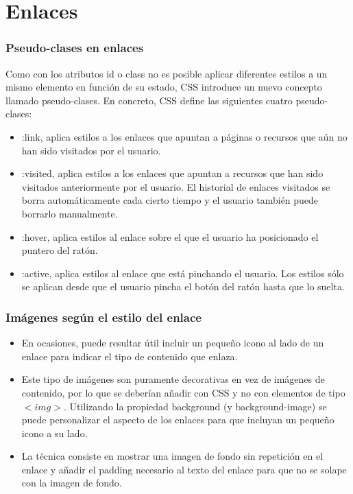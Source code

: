 \section{Enlaces}

\begin{frame}
\frametitle{Pseudo-clases en enlaces}

Como con los atributos id o class no es posible aplicar diferentes estilos a un mismo elemento en función de su estado, CSS introduce un nuevo concepto llamado pseudo-clases. En concreto, CSS define las siguientes cuatro pseudo-clases:

\begin{itemize}
  \item :link, aplica estilos a los enlaces que apuntan a páginas o recursos que aún no han sido visitados por el usuario.
  \item :visited, aplica estilos a los enlaces que apuntan a recursos que han sido visitados anteriormente por el usuario. El historial de enlaces visitados se borra automáticamente cada cierto tiempo y el usuario también puede borrarlo manualmente.
  \item :hover, aplica estilos al enlace sobre el que el usuario ha posicionado el puntero del ratón.
  \item :active, aplica estilos al enlace que está pinchando el usuario. Los estilos sólo se aplican desde que el usuario pincha el botón del ratón hasta que lo suelta.
\end{itemize}

\end{frame}



\begin{frame}
\frametitle{Imágenes según el estilo del enlace}

\begin{itemize}
  \item En ocasiones, puede resultar útil incluir un pequeño icono al lado de un enlace para indicar el tipo de contenido que enlaza.
  \item Este tipo de imágenes son puramente decorativas en vez de imágenes de contenido, por lo que se deberían añadir con CSS y no con elementos de tipo $<img>$. Utilizando la propiedad background (y background-image) se puede personalizar el aspecto de los enlaces para que incluyan un pequeño icono a su lado.
  \item La técnica consiste en mostrar una imagen de fondo sin repetición en el enlace y añadir el padding necesario al texto del enlace para que no se solape con la imagen de fondo.
\end{itemize}

\end{frame}


